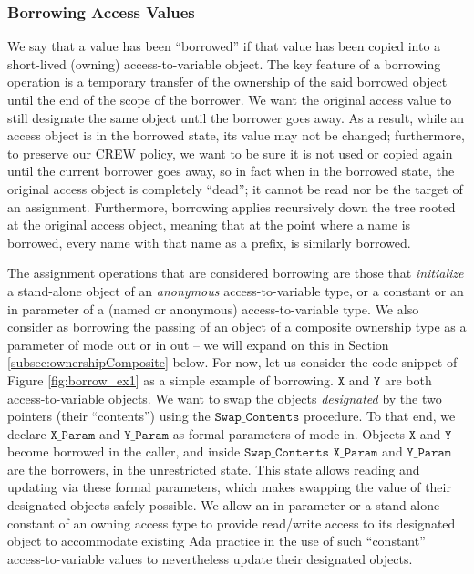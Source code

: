\documentclass{llncs}
\newcommand\var[1]{\ensuremath{\mathtt{#1}}}
\newcommand{\keyword}[1]{\textsf{#1}}
\begin{document}
\subsubsection{Borrowing Access Values}
\label{sec:borrowing}

We say that a value has been ``borrowed'' if that value has been copied into a short-lived (owning) access-to-variable  object.
The key feature of a borrowing operation is a temporary transfer of the ownership of the said borrowed object until the end of the scope of the borrower.
We want the original access value to still designate the same object until the borrower goes away. As a result, while an access object
is in the borrowed state, its value may not be changed; furthermore, to preserve our CREW policy, we want to be sure it is not used or copied again until the current borrower goes away, so in fact when in the borrowed state, the original access object is completely ``dead''; it cannot
be read nor be the target of an assignment. Furthermore, borrowing applies recursively down the tree rooted at the original access object, meaning that at the point where a name is borrowed,
every name with that name as a prefix, is similarly borrowed.

\smallskip
The assignment operations that are considered borrowing are those that \textit{initialize} a stand-alone object of an \textit{anonymous} access-to-variable type, or a \keyword{constant} or an \keyword{in} parameter of a (named or anonymous) access-to-variable
type.  We also consider as borrowing the passing of an object of a composite ownership type
as a parameter of mode \keyword{out} or \keyword{in out} -- we will expand on this in Section \ref{subsec:ownershipComposite} below. For now, let us consider the
code snippet of Figure \ref{fig:borrow_ex1} as a simple example of borrowing. \var{X} and \var{Y} are both access-to-variable objects. We want to swap the objects \textit{designated} by the two
pointers (their ``contents'') using the \var{Swap\_Contents} procedure. To that end, we declare \var{X\_Param} and \var{Y\_Param} as formal parameters of mode \keyword{in}. Objects \var{X} and \var{Y} become borrowed
in the caller, and inside \var{Swap\_Contents} \var{X\_Param} and \var{Y\_Param} are the borrowers, in the unrestricted state. This state allows reading and updating via these formal parameters, which makes swapping
the value of their designated objects safely possible. We allow an \keyword{in} parameter or a stand-alone constant of an owning access type to provide read/write access to its designated object to accommodate existing Ada practice in the use of such ``constant'' access-to-variable values to nevertheless update their designated objects.
\end{document}
